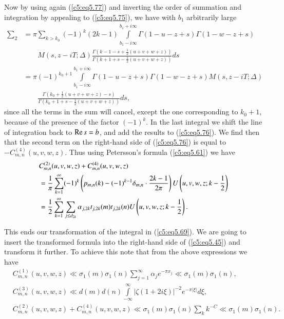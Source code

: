 Now by using again (\ref{c5:eq5.77}) and inverting the order of
summation and integration by appealing to (\ref{c5:eq5.75}), we have
with $b_1$ arbitrarily large 
\begin{align*}
 \sum_2 & = \pi \sum\limits_{k>k_0} (-1)^k (2k-1) \int\limits^{b_1+ i \infty}_{b_1-i\infty} \Gamma (1-u-z+s) \Gamma (1-w-z+s)\\
& \qquad  M (s,z-iT;\Delta) \frac{\Gamma (k-1-s + \frac{1}{2}
   (u+v+w+z))}{\Gamma (k+1+s-\frac{1}{2} (u+v+w+z))} ds\\ 
& = \pi (-1)^{k_0+1} \int\limits^{b_1 + i \infty}_{b_1 -i \infty}
 \Gamma (1-u-z+s) \Gamma (1-w-z+s) M (s, z - i T;\Delta) \\ 
& \qquad  \frac{\Gamma (k_0 + \frac{1}{2} (u+v+w+z)-s)}{\Gamma (k_0 +
   1+s-\frac{1}{2} (u+v+w+z))} ds, 
\end{align*}
since all the terms in the sum will cancel, except the one
corresponding to $k_0+1$, because of the presence of the factor
$(-1)^k$. In the last integral we shift the line of integration back
to $\operatorname{Re} s = b$, and add the results to (\ref{c5:eq5.76}). We find then
that the second term on the right-hand side of (\ref{c5:eq5.76}) is
equal to $-C^{(4)}_{m,n} (u,v,w,z)$. Thus using Petersson's formula
(\ref{c5:eq5.61}) we have  
\begin{align}
& C^{(2)}_{m,n} (u,v,w,z) + C^{(4)}_{m,n} (u,v,w,z)\label{c5:eq5.79}\\
& = \frac{1}{\pi} \sum\limits^\infty_{k=1} (-1)^k \left(p_{m,n} (k) -
  (-1)^{k-1} \delta_{m,n} \cdot \frac{2k-1}{2\pi} \right) U
  \left(u,v,w,z;k-\frac{1}{2} \right)\notag\\ 
& = \frac{1}{2} \sum\limits^{\infty}_{k=1} \sum\limits_{j \leq d_{2k}}
  \alpha_{j,2k} t_{j,2k} (m) t_{j,2k} (n)U \left(u,v,w,z;k-\frac{1}{2}
  \right).\notag  
\end{align}

This ends our transformation of the integral in (\ref{c5:eq5.69}). We
are going to insert the transformed formula into the right-hand side
of (\ref{c5:eq5.45}) and transform it further. To achieve this note
that from the above expressions we have
{\fontsize{9pt}{11pt}\selectfont  
\begin{align}
& C^{(1)}_{m,n} (u,v,w,z) \ll \sigma_1(m) \sigma_1(n)
  \sum\limits^\infty_{j=1} \alpha_j e^{-\pi x_j} \ll \sigma_1 (m)
  \sigma_1(n),\label{c5:eq5.80}\\ 
& C^{(3)}_{m,n} (u,v,w,z) \ll d(m) d (n) \int\limits^\infty_{-\infty}
  |\zeta(1+2i\xi)|^{-2} e^{-\pi |\xi|} d \xi, \label{c5:eq5.81}\\ 
& C^{(2)}_{m,n} (u,v,w,z) + C^{(4)}_{m,n} (u,v,w,z) \ll \sigma_1 (m)
  \sigma_1(n) \sum\limits_k k^{-C} \ll \sigma_1(m)
  \sigma_1(n).\label{c5:eq5.82} 
\end{align}}\pageoriginale

